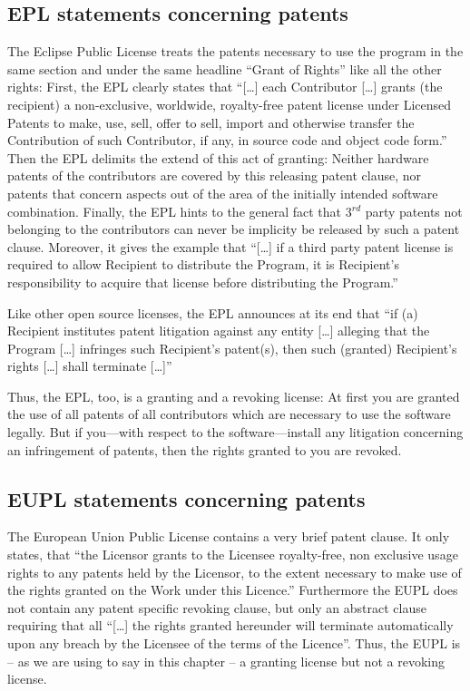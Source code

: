 \subsection{EPL statements concerning patents}\label{subsec:EpLPatentClause}

The Eclipse Public License treats the patents necessary to use the program
in the same section and under the same headline \enquote{Grant of Rights} like
all the other rights: First, the EPL clearly states that \enquote{[\ldots] each
Contributor [\ldots] grants (the recipient) a non-exclusive, worldwide,
royalty-free patent license under Licensed Patents to make, use, sell, offer to
sell, import and otherwise transfer the Contribution of such Contributor, if
any, in source code and object code form.} Then the EPL delimits
the extend of this act of granting: Neither hardware patents of the contributors
are covered by this releasing patent clause, nor patents that concern aspects
out of the area of the initially intended software combination.
Finally, the EPL hints to the general fact that 3$^{rd}$ party patents not
belonging to the contributors can never be implicity be released by such a
patent clause. Moreover, it gives the example that \enquote{[\ldots] if a third
party patent license is required to allow Recipient to distribute the Program,
it is Recipient's responsibility to acquire that license before distributing the
Program.}

Like other open source licenses, the EPL announces at its end that
\enquote{if (a) Recipient institutes patent litigation against any entity
[\ldots] alleging that the Program [\ldots] infringes such Recipient's
patent(s), then such (granted) Recipient's rights [\ldots] shall terminate
[\ldots]}

Thus, the EPL, too, is a granting and a revoking license: 
At first you are granted the use of all patents of all
contributors which are necessary to use the software legally. But if you---with
respect to the software---install any litigation concerning an infringement of
patents, then the rights granted to you are revoked.

\subsection{EUPL statements concerning patents}\label{subsec:EupLPatentClause}

The European Union Public License contains a very brief patent clause. It only
states, that \enquote{the Licensor grants to the Licensee royalty-free, non
exclusive usage rights to any patents held by the Licensor, to the extent
necessary to make use of the rights granted on the Work under this
Licence.}
Furthermore the EUPL does not contain any patent specific revoking clause, but
only an abstract clause requiring that all \enquote{[\ldots] the rights granted
hereunder will terminate automatically upon any breach by the Licensee of the
terms of the Licence}. Thus, the EUPL is -- as we are using to say
in this chapter -- a granting license but not a revoking license.

